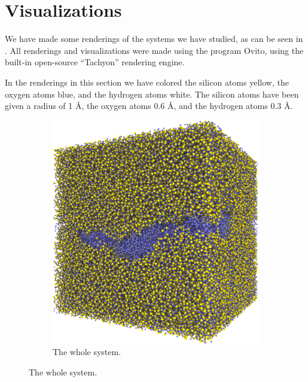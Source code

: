 \section{Visualizations}
We have made some renderings of the systems we have studied, as can be seen in . All renderings and visualizations were made using the program Ovito\cite{stukowski2010ovito}, using the built-in open-source ``Tachyon'' rendering engine.

In the renderings in this section we have colored the silicon atoms yellow, the oxygen atoms blue, and the hydrogen atoms white. The silicon atoms have been given a radius of 1 \AA, the oxygen atoms 0.6 \AA, and the hydrogen atoms 0.3 \AA.
%
\begin{figure}[!p]%
    \centering%
    \setlength{\myfigwidth}{0.49\textwidth}%
%
    \begin{subfigure}[t]{\myfigwidth}%
        \centering%
        \includegraphics[width=\textwidth]{images/systems/trimmed-rough_fracture01_abel_13}%
        \caption{The whole system.}%

\end{subfigure}
\end{figure}
